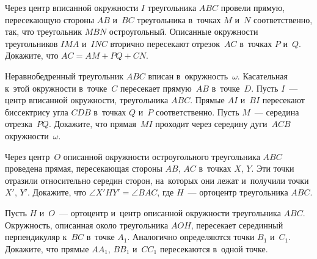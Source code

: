 


\begin{problems}


\item
Через центр вписанной окружности $I$ треугольника $ABC$ провели прямую,
пересекающую стороны $AB$ и~$BC$ треугольника в~точках $M$ и~$N$
соответственно, так, что треугольник $MBN$ остроугольный.
Описанные окружности треугольников $IMA$ и~$INC$ вторично пересекают
отрезок~$AC$ в~точках $P$ и~$Q$.
Докажите, что $AC = AM + PQ + CN$.

\item
Неравнобедренный треугольник $ABC$ вписан в~окружность~$\omega$.
Касательная к~этой окружности в~точке~$C$ пересекает прямую~$AB$ в~точке~$D$.
Пусть $I$~--- центр вписанной окружности, треугольника $ABC$.
Прямые $AI$ и~$BI$ пересекают биссектрису угла $CDB$ в~точках $Q$ и~$P$
соответственно.
Пусть $M$~--- середина отрезка~$PQ$.
Докажите, что прямая~$MI$ проходит через середину дуги~$ACB$
окружности~$\omega$.

\item
Через центр~$O$ описанной окружности остроугольного треугольника $ABC$
проведена прямая, пересекающая стороны $AB$, $AC$ в~точках $X$, $Y$.
Эти точки отразили относительно середин сторон, на~которых они лежат и~получили
точки $X'$, $Y'$.
Докажите, что $\angle X'HY' = \angle BAC$, где $H$~--- ортоцентр
треугольника $ABC$.


\item
Пусть $H$ и~$O$~--- ортоцентр и~центр описанной окружности треугольника $ABC$.
Окружность, описанная около треугольника $AOH$, пересекает серединный
перпендикуляр к~$BC$ в~точке $A_{1}$.
Аналогично определяются точки $B_{1}$ и~$C_{1}$.
Докажите, что прямые $AA_{1}$, $BB_{1}$ и~$CC_{1}$ пересекаются в~одной точке.


\end{problems}
